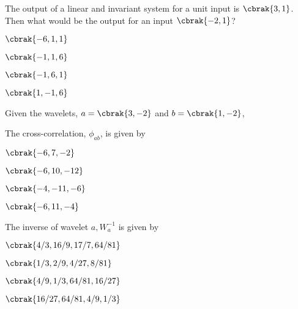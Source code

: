      \item The output of a linear and invariant system for a unit input is $\cbrak{3,1}$. Then what would be the output for an input $\cbrak{-2,1}$? \hfill{} 
            \begin {enumerate}
                \begin{multicols}{4}
                    \item $\cbrak{-6,1,1}$
                    \item $\cbrak{-1,1,6}$
                    \item $\cbrak{-1,6,1}$
                    \item $\cbrak{1,-1,6}$
                \end{multicols}
            \end{enumerate}
    Given the wavelets, $a=\cbrak{3,-2}$  and $b = \cbrak{1,-2}$,
        \item The cross-correlation, $\phi_{ab}$, is given by \hfill{} 
            \begin{enumerate}
                \begin{multicols}{2}
                    \item $\cbrak{-6,7,-2}$
                    \item $\cbrak{-6,10,-12}$
                    \item $\cbrak{-4,-11,-6}$
                    \item $\cbrak{-6,11,-4}$
                \end{multicols}            
            \end{enumerate}
    \item The inverse of wavelet $a, W^{-1}_a$ is given by \hfill{} 
        \begin{enumerate}
            \begin{multicols}{2}
                \item $\cbrak{4/3, 16/9, 17/7, 64/81}$
                \item $\cbrak{1/3, 2/9, 4/27, 8/81}$
                \item $\cbrak{4/9, 1/3, 64/81, 16/27}$
                \item $\cbrak{16/27, 64/81, 4/9, 1/3}$
            \end{multicols}

        \end{enumerate}
